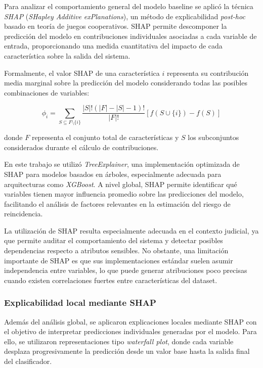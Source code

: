 \documentclass[11pt,a4paper]{article}
\begin{document}
Para analizar el comportamiento general del modelo baseline se aplicó la técnica \textit{SHAP} (\textit{SHapley Additive exPlanations}), un método de explicabilidad \textit{post-hoc} basado en teoría de juegos cooperativos. SHAP permite descomponer la predicción del modelo en contribuciones individuales asociadas a cada variable de entrada, proporcionando una medida cuantitativa del impacto de cada característica sobre la salida del sistema.

Formalmente, el valor SHAP de una característica \(i\) representa su contribución media marginal sobre la predicción del modelo considerando todas las posibles combinaciones de variables:

\[
\phi_i = \sum_{S \subseteq F \setminus \{i\}}
\frac{|S|!(|F|-|S|-1)!}{|F|!}
\left[f(S \cup \{i\}) - f(S)\right]
\]

donde \(F\) representa el conjunto total de características y \(S\) los subconjuntos considerados durante el cálculo de contribuciones.

En este trabajo se utilizó \textit{TreeExplainer}, una implementación optimizada de SHAP para modelos basados en árboles, especialmente adecuada para arquitecturas como \textit{XGBoost}. A nivel global, SHAP permite identificar qué variables tienen mayor influencia promedio sobre las predicciones del modelo, facilitando el análisis de factores relevantes en la estimación del riesgo de reincidencia.

La utilización de SHAP resulta especialmente adecuada en el contexto judicial, ya que permite auditar el comportamiento del sistema y detectar posibles dependencias respecto a atributos sensibles. No obstante, una limitación importante de SHAP es que sus implementaciones estándar suelen asumir independencia entre variables, lo que puede generar atribuciones poco precisas cuando existen correlaciones fuertes entre características del dataset.

\subsubsection{Explicabilidad local mediante SHAP}

Además del análisis global, se aplicaron explicaciones locales mediante SHAP con el objetivo de interpretar predicciones individuales generadas por el modelo. Para ello, se utilizaron representaciones tipo \textit{waterfall plot}, donde cada variable desplaza progresivamente la predicción desde un valor base hasta la salida final del clasificador.
\end{document}
